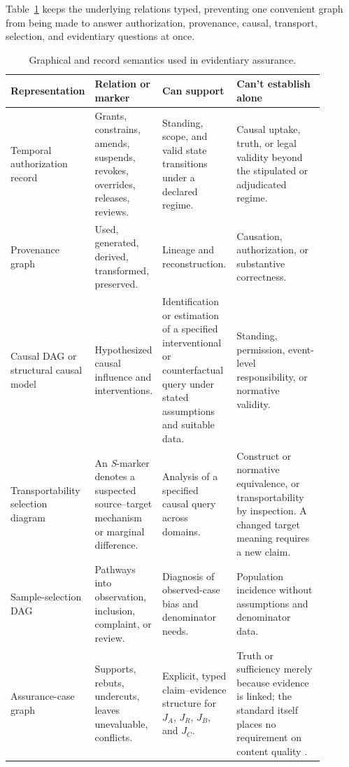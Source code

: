 Table~\ref{tab:representation-semantics} keeps the underlying relations typed, preventing one convenient graph from being made to answer authorization, provenance, causal, transport, selection, and evidentiary questions at once.

\begin{table}[!htbp]
\footnotesize
\centering
\begin{tabular}{>{\raggedright\arraybackslash}p{0.15\linewidth}%
                >{\raggedright\arraybackslash}p{0.18\linewidth}%
                >{\raggedright\arraybackslash}p{0.24\linewidth}%
                >{\raggedright\arraybackslash}p{0.32\linewidth}}
\toprule
Representation & Relation or marker & Can support & Can't establish alone \\
\midrule
Temporal authorization record & Grants, constrains, amends, suspends, revokes, overrides, releases, reviews. & Standing, scope, and valid state transitions under a declared regime. & Causal uptake, truth, or legal validity beyond the stipulated or adjudicated regime. \\
Provenance graph & Used, generated, derived, transformed, preserved. & Lineage and reconstruction. & Causation, authorization, or substantive correctness. \\
Causal DAG or structural causal model & Hypothesized causal influence and interventions. & Identification or estimation of a specified interventional or counterfactual query under stated assumptions and suitable data. & Standing, permission, event-level responsibility, or normative validity. \\
Transportability selection diagram & An \emph{S}-marker denotes a suspected source--target mechanism or marginal difference. & Analysis of a specified causal query across domains. & Construct or normative equivalence, or transportability by inspection. A changed target meaning requires a new claim. \\
Sample-selection DAG & Pathways into observation, inclusion, complaint, or review. & Diagnosis of observed-case bias and denominator needs. & Population incidence without assumptions and denominator data. \\
Assurance-case graph & Supports, rebuts, undercuts, leaves unevaluable, conflicts. & Explicit, typed claim--evidence structure for \(J_A\), \(J_R\), \(J_B\), and \(J_C\). & Truth or sufficiency merely because evidence is linked; the standard itself places no requirement on content quality \citep{isoIecIeee2022assuranceCase}. \\
\bottomrule
\end{tabular}
\caption{Graphical and record semantics used in evidentiary assurance.}
\label{tab:representation-semantics}
\end{table}
\FloatBarrier

